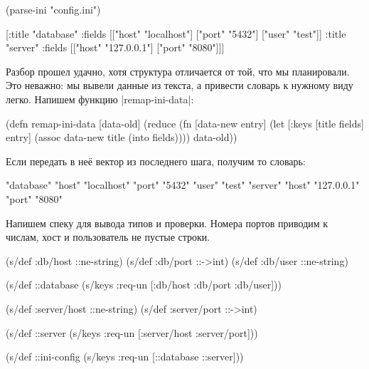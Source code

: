 \begin{english}
  \begin{clojure}
(parse-ini "config.ini")

[{:title "database"
  :fields [["host" "localhost"]
           ["port" "5432"]
           ["user" "test"]]}
 {:title "server"
  :fields [["host" "127.0.0.1"]
           ["port" "8080"]]}]
  \end{clojure}
\end{english}

Разбор прошел удачно, хотя структура отличается от той, что мы планировали. Это
неважно: мы вывели данные из текста, а привести словарь к нужному виду
легко. Напишем функцию \spverb|remap-ini-data|:

\begin{english}
  \begin{clojure}
(defn remap-ini-data [data-old]
  (reduce
   (fn [data-new entry]
     (let [{:keys [title fields]} entry]
       (assoc data-new title (into {} fields))))
   {}
   data-old))
  \end{clojure}
\end{english}

\noindent
Если передать в не\"{е} вектор из последнего шага, получим то словарь:

\begin{english}
  \begin{clojure}
{"database" {"host" "localhost" "port" "5432" "user" "test"}
 "server" {"host" "127.0.0.1" "port" "8080"}}
  \end{clojure}
\end{english}

Напишем спеку для вывода типов и проверки. Номера портов приводим к числам, хост
и пользователь не пустые строки.

\begin{english}
  \begin{clojure}
(s/def :db/host ::ne-string)
(s/def :db/port ::->int)
(s/def :db/user ::ne-string)

(s/def ::database
  (s/keys :req-un [:db/host :db/port :db/user]))

(s/def :server/host ::ne-string)
(s/def :server/port ::->int)

(s/def ::server
  (s/keys :req-un [:server/host :server/port]))

(s/def ::ini-config
  (s/keys :req-un [::database ::server]))
  \end{clojure}
\end{english}

